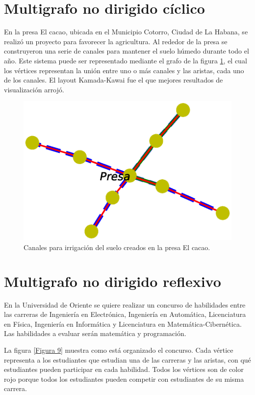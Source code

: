 \documentclass{article}
\begin{document}



\section{Multigrafo no dirigido cíclico}

En la presa El cacao, ubicada en el Municipio Cotorro, Ciudad de La Habana, se realizó un proyecto para favorecer la agricultura. Al rededor de la presa se construyeron una serie de canales para mantener el suelo húmedo durante todo el año.
Este sistema puede ser representado mediante el grafo de la figura \ref{Figura 8}, el cual los vértices representan la unión entre uno o más canales y las aristas, cada uno de los canales. El layout Kamada-Kawai fue el que mejores resultados de visualización arrojó.

\begin{figure}
  \includegraphics[width=.8\columnwidth]{fig8.eps}
  \caption{Canales para irrigación del suelo creados en la presa El cacao.}
  \label{Figura 8}
\end{figure}
\newpage



\section{Multigrafo no dirigido reflexivo}

En la Universidad de Oriente se quiere realizar un concurso de habilidades entre las carreras de Ingeniería en Electrónica, Ingeniería en Automática, Licenciatura en Física, Ingeniería en Informática y Licenciatura en Matemática-Cibernética. Las habilidades a evaluar serán matemática y programación. 

La figura \ref{Figura 9} muestra como está organizado el concurso. Cada vértice representa a los estudiantes que estudian una de las carreras y las aristas, con qué estudiantes pueden participar en cada habilidad. Todos los vértices son de color rojo porque todos los estudiantes pueden competir con estudiantes de su misma carrera.
\end{document}
